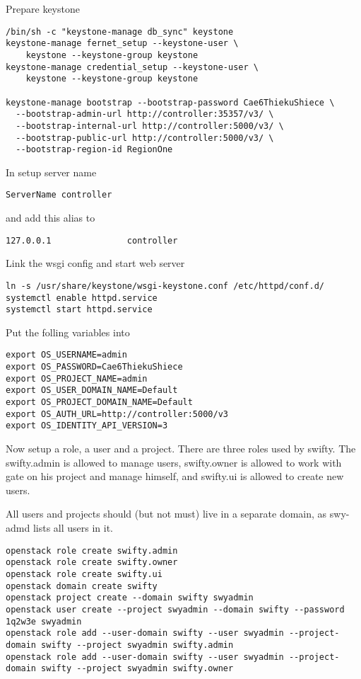Prepare keystone

\begin{lstlisting}
/bin/sh -c "keystone-manage db_sync" keystone
keystone-manage fernet_setup --keystone-user \
	keystone --keystone-group keystone
keystone-manage credential_setup --keystone-user \
	keystone --keystone-group keystone

keystone-manage bootstrap --bootstrap-password Cae6ThiekuShiece \
  --bootstrap-admin-url http://controller:35357/v3/ \
  --bootstrap-internal-url http://controller:5000/v3/ \
  --bootstrap-public-url http://controller:5000/v3/ \
  --bootstrap-region-id RegionOne
\end{lstlisting}

In \code{/etc/httpd/conf/httpd.conf} setup server name

\begin{lstlisting}
ServerName controller
\end{lstlisting}

and add this alias to \code{/etc/hosts}

\begin{lstlisting}
127.0.0.1               controller
\end{lstlisting}

Link the wsgi config and start web server

\begin{lstlisting}
ln -s /usr/share/keystone/wsgi-keystone.conf /etc/httpd/conf.d/
systemctl enable httpd.service
systemctl start httpd.service
\end{lstlisting}

Put the folling variables into 

\begin{lstlisting}
export OS_USERNAME=admin
export OS_PASSWORD=Cae6ThiekuShiece
export OS_PROJECT_NAME=admin
export OS_USER_DOMAIN_NAME=Default
export OS_PROJECT_DOMAIN_NAME=Default
export OS_AUTH_URL=http://controller:5000/v3
export OS_IDENTITY_API_VERSION=3
\end{lstlisting}

Now setup a role, a user and a project. There are three roles
used by swifty. The swifty.admin is allowed to manage users,
swifty.owner is allowed to work with gate on his project and
manage himself, and swifty.ui is allowed to create new users.

All users and projects should (but not must) live in a separate
domain, as swy-admd lists all users in it.

\begin{lstlisting}
openstack role create swifty.admin
openstack role create swifty.owner
openstack role create swifty.ui
openstack domain create swifty
openstack project create --domain swifty swyadmin
openstack user create --project swyadmin --domain swifty --password 1q2w3e swyadmin
openstack role add --user-domain swifty --user swyadmin --project-domain swifty --project swyadmin swifty.admin
openstack role add --user-domain swifty --user swyadmin --project-domain swifty --project swyadmin swifty.owner
\end{lstlisting}

